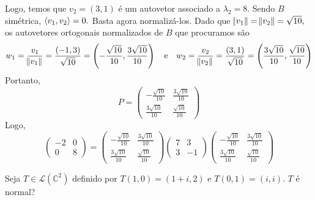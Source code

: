 \documentclass[11pt,a4paper]{article}
\begin{document}
{{Logo, temos que $v_2 = (3,1)$ é um autovetor associado a $\lambda_2 = 8.$ 
Sendo $B$ simétrica, $\left\langle v_1, v_2 \right\rangle = 0.$ Basta agora normalizá-los. Dado que $\norm{v_1} = \norm{v_2} = \sqrt{10},$ os autovetores ortogonais normalizados de $B$ que procuramos são
\[
w_1 = \frac{v_1}{\norm{v_1}} = \frac{(-1,3)}{\sqrt{10}} = \left(-\frac{\sqrt{10}}{10}, \frac{3 \sqrt{10}}{10} \right) \quad \mbox{e} \quad w_2 = \frac{v_2}{\norm{v_2}} = \frac{(3,1)}{\sqrt{10}} = \left(\frac{3\sqrt{10}}{10}, \frac{ \sqrt{10}}{10} \right) 
\]
Portanto, 
\[
P = \begin{pmatrix}
-\frac{\sqrt{10}}{10} & \frac{3\sqrt{10}}{10} \\
\frac{3 \sqrt{10}}{10} & \frac{\sqrt{10}}{10} 
\end{pmatrix}
\]
Logo,
\[
 \begin{pmatrix}
-2 & 0 \\
0 & 8
\end{pmatrix} = \begin{pmatrix}
-\frac{\sqrt{10}}{10} & \frac{3\sqrt{10}}{10} \\
\frac{3 \sqrt{10}}{10} & \frac{\sqrt{10}}{10} 
\end{pmatrix}
 \begin{pmatrix}
7 & 3 \\
3 & -1
\end{pmatrix}
\begin{pmatrix}
-\frac{\sqrt{10}}{10} & \frac{3\sqrt{10}}{10} \\
\frac{3 \sqrt{10}}{10} & \frac{\sqrt{10}}{10}  
\end{pmatrix}
\]
} 
}


\begin{exercicio}

Seja $T \in \mathcal{L}(\mathbb{C}^2)$ definido por $T(1, 0) = (1 + i, 2)$ e $T(0, 1) = (i, i).$ $T$ é normal?
\end{exercicio}
\end{document}

